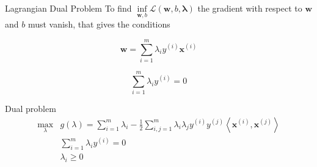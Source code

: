 \documentclass{beamer}
\begin{document}
\begin{frame}{Lagrangian Dual Problem}
    To find $\inf\limits_{\mathbf{w}, b} \mathcal{L} (\mathbf{w}, b, \mathbf{\lambda})$
    the gradient with respect to $\mathbf{w}$ and $b$ must vanish, that gives the
    conditions

    \begin{equation}
        \mathbf{w} = \sum\limits^m_{i=1} \lambda_i y^{(i)} \mathbf{x}^{(i)}
        \label{cond1}
    \end{equation}

    \begin{equation}
        \sum\limits^m_{i=1} \lambda_i y^{(i)} = 0
        \label{cond2}
    \end{equation}
    

    \begin{block}{Dual problem}
        \begin{equation}
            \begin{array}{ll}
                \max_\lambda & g(\lambda) = \sum\limits^m_{i=1} \lambda_i -
                \frac{1}{2} \sum\limits^m_{i,j=1} \lambda_i \lambda_j y^{(i)} y^{(j)}
                \left< \mathbf{x}^{(i)}, \mathbf{x}^{(j)} \right> \\[.2cm]
                & \sum\limits^m_{i=1} \lambda_i y^{(i)} = 0 \\[.2cm]
                & \lambda_i \ge 0
            \end{array}
        \end{equation}
    \end{block}
\end{frame}
\end{document}
